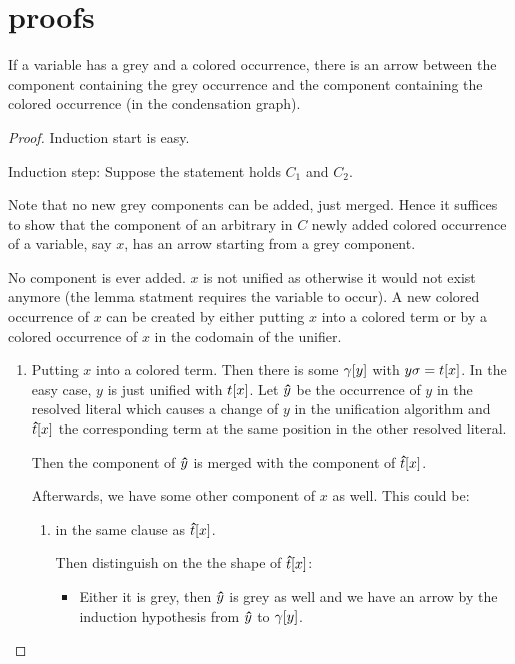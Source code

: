 \documentclass[,%
	paper=a4,%
	DIV10, %
	twoside=false,%
	liststotoc,
	bibtotoc,
	draft=false,%
	numbers=noendperiod
]{scrartcl}
\begin{document}
\section*{proofs}
\begin{conj}[Lemma 1]

	If a variable has a grey and a colored occurrence, there is an arrow between the component containing the grey occurrence and the component containing the colored occurrence (in the condensation graph).
\end{conj}
\begin{proof}
	Induction start is easy.
	
	Induction step:
	Suppose the statement holds $C_1$ and $C_2$.

	Note that no new grey components can be added, just merged.
	Hence it suffices to show that the component of an arbitrary in $C$ newly added colored occurrence of a variable, say $x$, has an arrow starting from a grey component.

	No component is ever added. $x$ is not unified as otherwise it would not exist anymore (the lemma statment requires the variable to occur).
	A new colored occurrence of $x$ can be created by either putting $x$ into a colored term or by a colored occurrence of $x$ in the codomain of the unifier.

	\begin{enumerate}
			\item Putting $x$ into a colored term.
				Then there is some $\gamma[y]$ with $y\sigma = t[x]$.
				In the easy case, $y$ is just unified with $t[x]$.
				Let $\bm\hat y $ be the occurrence of $y$ in the resolved literal which causes a change of $y$ in the unification algorithm and $\bm\hat t[x]$ the corresponding term at the same position in the other resolved literal.

				Then the component of $\bm\hat y$ is merged with the component of $\bm\hat t[x]$.
				
				Afterwards, we have some other component of $x$ as well. This could be:
				\begin{enumerate}
					\item in the same clause as $\bm\hat t[x]$.

						Then distinguish on the the shape of $\bm\hat t[x]$:
						
						\begin{itemize}
								\item
						Either it is grey, then $\bm\hat y$ is grey as well and we have an arrow by the induction hypothesis from $\bm\hat y$ to $\gamma[y]$.


\end{itemize}
\end{enumerate}
\end{enumerate}
\end{proof}
\end{document}
